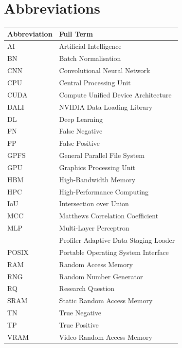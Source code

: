 \section*{Abbreviations}

\begin{center}
\begin{tabular}{ll}
\toprule
\textbf{Abbreviation} & \textbf{Full Term} \\
\midrule
AI     & Artificial Intelligence \\
BN     & Batch Normalisation \\
CNN    & Convolutional Neural Network \\
CPU    & Central Processing Unit \\
CUDA   & Compute Unified Device Architecture \\
DALI   & NVIDIA Data Loading Library \\
DL     & Deep Learning \\
FN     & False Negative \\
FP     & False Positive \\
GPFS   & General Parallel File System \\
GPU    & Graphics Processing Unit \\
HBM    & High-Bandwidth Memory \\
HPC    & High-Performance Computing \\
IoU    & Intersection over Union \\
MCC    & Matthews Correlation Coefficient \\
MLP    & Multi-Layer Perceptron \\
\pads{}& Profiler-Adaptive Data Staging Loader \\
POSIX  & Portable Operating System Interface \\
RAM    & Random Access Memory \\
RNG    & Random Number Generator \\
RQ     & Research Question \\
SRAM   & Static Random Access Memory \\
TN     & True Negative \\
TP     & True Positive \\
VRAM   & Video Random Access Memory \\
\bottomrule
\end{tabular}
\end{center}
